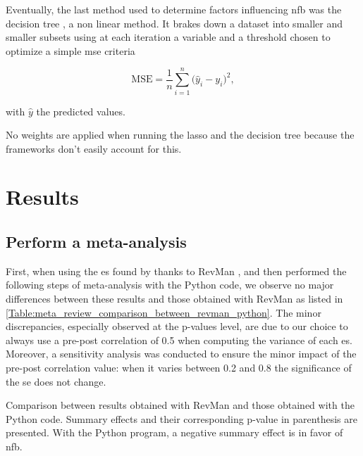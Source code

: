 \documentclass[12pt,a4paper,english]{article}
\begin{document}
Eventually, the last method used to determine factors influencing \gls{nfb} was the decision tree \citep{Quinlan1986}, a non linear method. It brakes down a dataset into smaller
and smaller subsets using at each iteration a variable and a threshold chosen to optimize a simple \gls{mse} criteria 

\begin{equation}
\label{eq:factors_decision_tree_mse}
\text{MSE} = \frac{1}{n}\sum_{i=1}^{n} \Big(\hat{y}_i - {y}_i\Big)^2,
\end{equation}

with $\hat{y}$ the predicted values.

No weights are applied when running the \gls{lasso} and the decision tree because the frameworks don't easily account for this.


\clearpage

\section{Results}

\subsection{Perform a meta-analysis}

First, when using the \gls{es} found by \citet{Cortese2016} thanks to RevMan \citep{RevMan}, and then performed the following steps 
of meta-analysis with the Python code, we observe no major differences between these results and those obtained with RevMan \citep{RevMan} 
as listed in \cref{Table:meta_review_comparison_between_revman_python}. The minor discrepancies, especially observed at the p-values level,
are due to our choice to always use a pre-post correlation of 0.5 when computing the variance of each \gls{es}. Moreover, a sensitivity 
analysis was conducted to ensure the minor impact of the pre-post correlation value: when it varies between 0.2 and 0.8 the significance 
of the \gls{se} does not change. 

\begin{table}[h!]
  \centering
  \caption{Comparison between \citet{Cortese2016} results obtained with RevMan \citep{RevMan} and those obtained with the Python code. Summary 
	effects and their corresponding p-value in parenthesis are presented. With the Python program, a negative summary effect is in favor of \gls{nfb}.}

  \label{Table:meta_review_comparison_between_revman_python}
\end{table}
\end{document}

